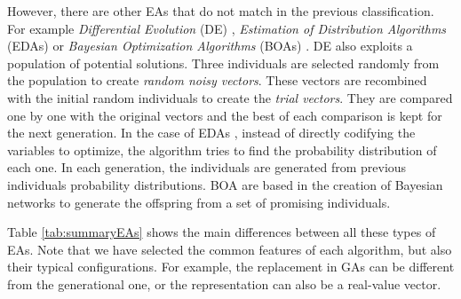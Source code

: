 \documentclass{article}
\begin{document}
\begin{description}
\end{description}


However, there are other EAs that do not match in the previous
classification. For example \textit{Differential Evolution} (DE)
\cite{storn1997differential}, \textit{Estimation of Distribution
  Algorithms} (EDAs) \cite{larranaga2002estimation} or
\textit{Bayesian Optimization Algorithms} (BOAs)
\cite{pelikan2005bayesian}. DE \cite{storn1997differential} also
exploits a population of potential solutions. Three individuals are
selected randomly from the population to create \textit{random noisy
  vectors}. These vectors are recombined with the initial random
individuals to create the \textit{trial vectors}. They are compared
one by one with the original vectors and the best of each comparison
is kept for the next generation. In the case of EDAs
\cite{larranaga2002estimation}, instead of directly codifying the
variables to optimize, the algorithm tries to find the probability
distribution of each one. In each generation, the individuals are
generated from previous individuals probability distributions. BOA
\cite{pelikan2005bayesian} are based in the creation of Bayesian
networks to generate the offspring from a set of promising
individuals. %


Table \ref{tab:summaryEAs} shows the main differences between all
these types of EAs. Note that we have selected the common features of
each algorithm, but also their typical configurations. For example,
the replacement in GAs can be different from the generational one, or
the representation can also be a real-value vector.
\end{document}
